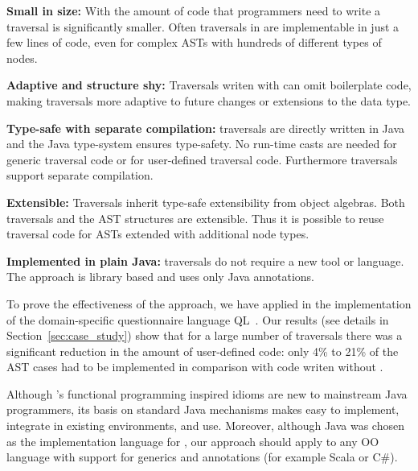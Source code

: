 \begin{itemize*}

\item {\bf Small in size:} With \name the amount of code that
  programmers need to write a traversal is significantly smaller.
  Often traversals in \name are implementable in just a few lines
  of code, even for complex ASTs with hundreds of different types of
  nodes.

\item {\bf Adaptive and structure shy:}  Traversals writen with \name can omit
  boilerplate code, making traversals more adaptive to
  future changes or extensions to the data type.

\item {\bf Type-safe with separate compilation:} \name traversals are directly written in Java
  and the Java type-system ensures type-safety. No run-time casts are
  needed for generic traversal code or for user-defined traversal
  code. Furthermore \name traversals support separate compilation.

\item {\bf Extensible:} Traversals inherit type-safe
  extensibility from object algebras. Both traversals and the AST structures
  are extensible. Thus it is possible to
  reuse traversal code for ASTs extended with additional
  node types.

\item {\bf Implemented in plain Java:} \name traversals do not require
  a new tool or language. The approach is library based and uses only
  Java annotations.


\end{itemize*}

To prove the effectiveness of the approach, we have applied \name in
the implementation of the domain-specific questionnaire language
QL~\cite{gouseti14extensible}.  Our results (see details in
Section~\ref{sec:case_study}) show that for a large number of traversals there was a
significant reduction in the amount of user-defined code: only 4\% to
21\% of the AST cases had to be implemented in comparison with code
writen without \name.

Although \name's functional programming inspired idioms are new to
mainstream Java programmers, its basis on standard Java 
mechanisms makes \name easy to implement, integrate in existing
environments, and use.  Moreover, although Java was chosen as the
implementation language for \Name, our approach should apply to any OO
language with support for generics and annotations (for example Scala or C\#).

